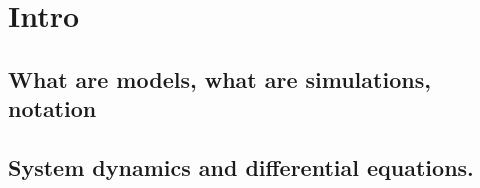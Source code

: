 \section{Intro}

\subsection{What are models, what are simulations, notation}

\subsection{System dynamics and differential equations.}



